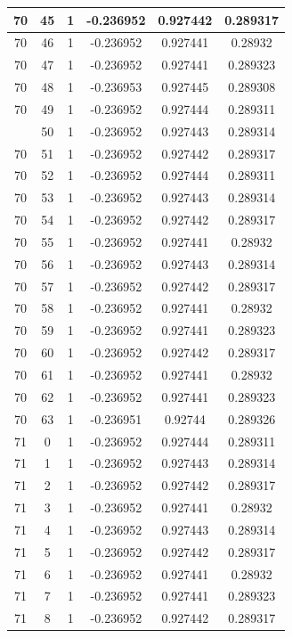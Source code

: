 \documentclass[12pt,a4paper]{article}
\numberwithin{equation}{section}
\numberwithin{figure}{section}
\numberwithin{table}{section}
\begin{document}
\begin{longtable}{|c|c|c|c|c|c|}
70 & 45 & 1 & -0.236952 & 0.927442 & 0.289317 \\ \hline
70 & 46 & 1 & -0.236952 & 0.927441 & 0.28932 \\ \hline
70 & 47 & 1 & -0.236952 & 0.927441 & 0.289323 \\ \hline
70 & 48 & 1 & -0.236953 & 0.927445 & 0.289308 \\ \hline
70 & 49 & 1 & -0.236952 & 0.927444 & 0.289311 \\ \hline
\pagebreak
70 & 50 & 1 & -0.236952 & 0.927443 & 0.289314 \\ \hline
70 & 51 & 1 & -0.236952 & 0.927442 & 0.289317 \\ \hline
70 & 52 & 1 & -0.236952 & 0.927444 & 0.289311 \\ \hline
70 & 53 & 1 & -0.236952 & 0.927443 & 0.289314 \\ \hline
70 & 54 & 1 & -0.236952 & 0.927442 & 0.289317 \\ \hline
70 & 55 & 1 & -0.236952 & 0.927441 & 0.28932 \\ \hline
70 & 56 & 1 & -0.236952 & 0.927443 & 0.289314 \\ \hline
70 & 57 & 1 & -0.236952 & 0.927442 & 0.289317 \\ \hline
70 & 58 & 1 & -0.236952 & 0.927441 & 0.28932 \\ \hline
70 & 59 & 1 & -0.236952 & 0.927441 & 0.289323 \\ \hline
70 & 60 & 1 & -0.236952 & 0.927442 & 0.289317 \\ \hline
70 & 61 & 1 & -0.236952 & 0.927441 & 0.28932 \\ \hline
70 & 62 & 1 & -0.236952 & 0.927441 & 0.289323 \\ \hline
70 & 63 & 1 & -0.236951 & 0.92744 & 0.289326 \\ \hline
71 & 0 & 1 & -0.236952 & 0.927444 & 0.289311 \\ \hline
71 & 1 & 1 & -0.236952 & 0.927443 & 0.289314 \\ \hline
71 & 2 & 1 & -0.236952 & 0.927442 & 0.289317 \\ \hline
71 & 3 & 1 & -0.236952 & 0.927441 & 0.28932 \\ \hline
71 & 4 & 1 & -0.236952 & 0.927443 & 0.289314 \\ \hline
71 & 5 & 1 & -0.236952 & 0.927442 & 0.289317 \\ \hline
71 & 6 & 1 & -0.236952 & 0.927441 & 0.28932 \\ \hline
71 & 7 & 1 & -0.236952 & 0.927441 & 0.289323 \\ \hline
71 & 8 & 1 & -0.236952 & 0.927442 & 0.289317 \\ \hline

\end{longtable}
\end{document}
